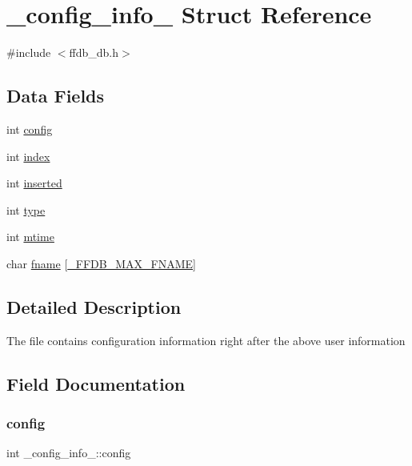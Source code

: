 \hypertarget{struct__config__info__}{}\section{\+\_\+config\+\_\+info\+\_\+ Struct Reference}
\label{struct__config__info__}


{\ttfamily \#include $<$ffdb\+\_\+db.\+h$>$}

\subsection*{Data Fields}
\begin{DoxyCompactItemize}
\item 
int \mbox{\hyperlink{struct__config__info___a09951516146d151d7fb112d8e6d834b7}{config}}
\item 
int \mbox{\hyperlink{struct__config__info___a78aa940c1f0397a3f7acfd7b2ed3a196}{index}}
\item 
int \mbox{\hyperlink{struct__config__info___a1b87a01f516bd83ef533699c6ac16c92}{inserted}}
\item 
int \mbox{\hyperlink{struct__config__info___af58415103a98083a811c0930139f13dc}{type}}
\item 
int \mbox{\hyperlink{struct__config__info___a57f55946a7e2b18f510873fac9b24a56}{mtime}}
\item 
char \mbox{\hyperlink{struct__config__info___ab1ec0b2787d132f27ac64dde75f6c3ae}{fname}} \mbox{[}\mbox{\hyperlink{install_2include_2ffdb__db_8h_a00ab19cd96ae7c01686ceec249b62522}{\+\_\+\+F\+F\+D\+B\+\_\+\+M\+A\+X\+\_\+\+F\+N\+A\+ME}}\mbox{]}
\end{DoxyCompactItemize}


\subsection{Detailed Description}
The file contains configuration information right after the above user information 

\subsection{Field Documentation}
\mbox{\label{struct__config__info___a09951516146d151d7fb112d8e6d834b7}} 
\subsubsection{\texorpdfstring{config}{config}}
{\footnotesize\ttfamily int \+\_\+config\+\_\+info\+\_\+\+::config}

